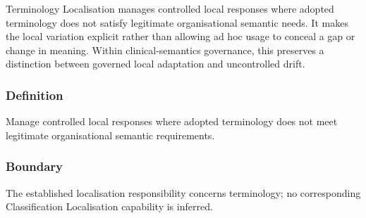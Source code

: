 Terminology Localisation manages controlled local responses where adopted terminology does not satisfy legitimate organisational semantic needs. It makes the local variation explicit rather than allowing ad hoc usage to conceal a gap or change in meaning. Within clinical-semantics governance, this preserves a distinction between governed local adaptation and uncontrolled drift.

\subsubsection*{Definition}

Manage controlled local responses where adopted terminology does not meet legitimate organisational semantic requirements.

\subsubsection*{Boundary}

The established localisation responsibility concerns terminology; no corresponding Classification Localisation capability is inferred.


